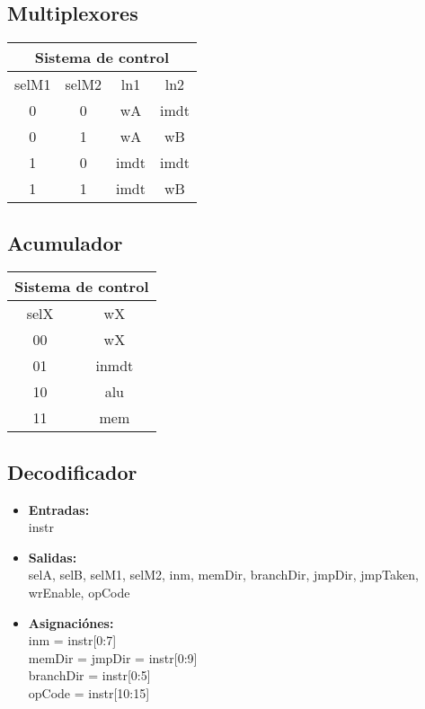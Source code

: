 \documentclass[paper=letter, fontsize=12pt]{article}
\begin{document}
\subsection{Multiplexores}

\begin{table}[h]
\centering
\begin{tabular}{cc|cc}
\multicolumn{4}{c}{Sistema de control} \\ \hline
selM1 & selM2 & ln1 	& ln2  \\ \hline
0     & 0     & wA 	& imdt \\
0     & 1     & wA	& wB   \\
1     & 0     & imdt	& imdt \\
1     & 1     & imdt	& wB   \\
\end{tabular}
\end{table}

\subsection{Acumulador}

\begin{table}[h]
\centering
\begin{tabular}{c|c}
\multicolumn{2}{c}{Sistema de control} \\ \hline
selX   & wX    \\ \hline
00     & wX    \\
01     & inmdt \\
10     & alu   \\
11     & mem   \\
\end{tabular}
\end{table}


\pagebreak
\subsection{Decodificador}

\begin{itemize}
\item \textbf{Entradas:}\\
instr
\item \textbf{Salidas:}\\
selA, selB, selM1, selM2, inm, memDir, branchDir, jmpDir, jmpTaken, wrEnable, opCode
\item \textbf{Asignaciónes:} \\
inm = instr[0:7] \\
memDir = jmpDir = instr[0:9] \\
branchDir = instr[0:5] \\
opCode = instr[10:15]
\end{itemize}
\end{document}

